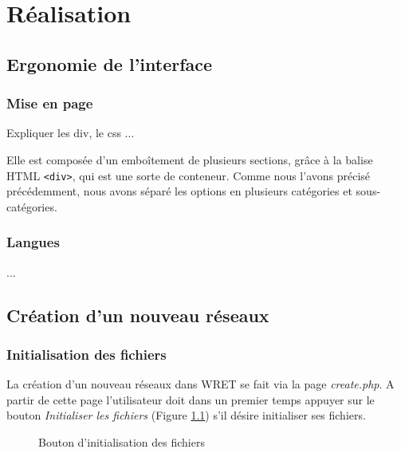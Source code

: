 \chapter{Réalisation}

\section{Ergonomie de l'interface}

\subsection{Mise en page}
Expliquer les div, le css ...

Elle est composée d'un emboîtement de plusieurs sections, grâce à la balise HTML  \texttt{<div>}, qui est une sorte de conteneur. Comme nous l'avons précisé précédemment, nous avons séparé les options en plusieurs catégories et sous-catégories. 

\subsection{Langues}
...

\section{Création d'un nouveau réseaux}

\subsection{Initialisation des fichiers}
La création d'un nouveau réseaux dans WRET se fait via la page \emph{create.php}.
A partir de cette page l'utilisateur doit dans un premier temps appuyer sur le bouton \emph{Initialiser les fichiers} (Figure \ref{boutonInit}) s'il désire initialiser ses fichiers. 

\begin{figure}[!ht]
	\begin{center}
		\caption{Bouton d'initialisation des fichiers}
  		\label{boutonInit}
  	\end{center}	
\end{figure}

